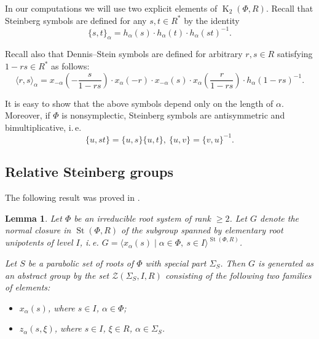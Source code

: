 \documentclass[oneside, 10pt]{amsart}
\newtheorem{lemma}{Lemma}
\theoremstyle{remark}
\theoremstyle{definition}
\DeclareMathOperator{\St}{St}
\DeclareMathOperator{\K}{K}
\numberwithin{equation}{section}
\begin{document}
In our computations we will use two explicit elements of $\K_2(\Phi, R)$. Recall that Steinberg symbols are defined for any $s, t \in R^*$ by the identity
\[ \{ s, t \}_\alpha = h_\alpha(s) \cdot h_\alpha(t) \cdot h_\alpha(st)^{-1}. \]

Recall also that Dennis--Stein symbols are defined for arbitrary $r, s\in R$ satisfying $1 - rs \in R^*$ as follows:
\begin{equation} \label{eq:dennis-stein}
 \langle r,s \rangle _ \alpha = x_{-\alpha}\left(-\frac{s}{1 - rs}\right) \cdot x_{\alpha}(-r) \cdot x_{-\alpha}(s) \cdot x_{\alpha}\left(\frac{r}{1-rs}\right) \cdot h_{\alpha}(1 - rs)^{-1}.
\end{equation} 

It is easy to show that the above symbols depend only on the length of $\alpha$.
Moreover, if $\Phi$ is nonsymplectic, Steinberg symbols are antisymmetric and bimultiplicative, i.\,e. \begin{equation} \label{eq:symbol-properties} \{ u, st \} = \{ u, s\} \{ u, t \}, \ \{ u, v \} = \{ v, u\}^{-1}. \end{equation}

\subsection{Relative Steinberg groups}

The following result was proved in \cite[Proposition~3.2]{Ste13}.
\begin{lemma}\label{lem:Zgen} Let $\Phi$ be an irreducible root system of rank $\geq 2$. 
Let $G$ denote the normal closure in $\St(\Phi, R)$ of the subgroup spanned by elementary root unipotents of level $I$, i.\,e. $G=\langle x_\alpha(s) \mid \alpha\in\Phi,\ s\in I\rangle^{\St(\Phi, R)}$.

Let $S$ be a parabolic set of roots of $\Phi$ with special part $\Sigma_S$. Then $G$ is generated as an abstract group by the set $\mathcal{Z}(\Sigma_S, I, R)$ consisting of the following two families of elements:
\begin{itemize}
 \item $x_{\alpha}(s)$, where $s\in I$, $\alpha\in\Phi$;
 \item $z_\alpha(s,\xi)$, where $s\in I$, $\xi\in R$, $\alpha\in\Sigma_S$.
\end{itemize}        
\end{lemma}
\end{document}
